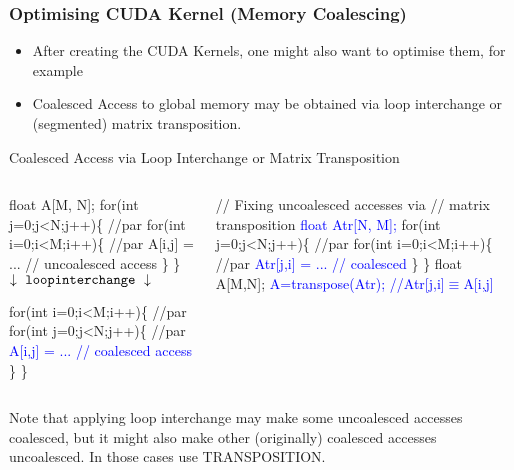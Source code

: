 \documentclass{beamer}
\newcommand{\blue}[1]{\textcolor{Blue}{{#1}}}
\newcommand{\emp}[1]{\textcolor{DikuRed}{ #1}}
\newcommand{\emphh}[1]{\textcolor{CosGreen}{ #1}}
\newcommand{\mymath}[1]{$ #1 $}
\begin{document}
\begin{frame}[fragile]
	\tableofcontents[currentsubsection]
\end{frame}


\begin{frame}[fragile,t]
  \frametitle{Optimising CUDA Kernel (Memory Coalescing)} %


\begin{itemize}
\item After creating the CUDA Kernels, one might also want to
        optimise them, for example
\item Coalesced Access to global memory may be obtained via
        loop interchange or (segmented) matrix transposition. 
\end{itemize}
\vspace{-2ex}
\begin{block}{Coalesced Access via Loop Interchange or Matrix Transposition}
\begin{columns}
\begin{colorcode}
\emp{float A[M, N];}
\emphh{for(int j=0;j<N;j++)\{ //par}
  \emphh{for(int i=0;i<M;i++)\{ //par}
    \emp{A[i,j] = ... // uncoalesced access} 
\} \}  \mymath{\downarrow \ {\tt loop interchange} \ \downarrow}

\emphh{for(int i=0;i<M;i++)\{ //par}
  \emphh{for(int j=0;j<N;j++)\{ //par}
    \blue{A[i,j] = ... // coalesced access} 
\} \}
\end{colorcode}
\begin{colorcode}
// Fixing uncoalesced accesses via 
// matrix transposition
\blue{float Atr[N, M];}
\emphh{for(int j=0;j<N;j++)\{ //par}
  \emphh{for(int i=0;i<M;i++)\{ //par}
    \blue{Atr[j,i] = ... // coalesced} 
\} \}
float A[M,N];
\blue{A=transpose(Atr); //Atr[j,i]\mymath{\equiv}A[i,j]}
\end{colorcode}
\end{columns}
\end{block} 

\emp{Note that applying loop interchange may make some uncoalesced
accesses coalesced, but it might also make other (originally) coalesced
accesses uncoalesced. In those cases use TRANSPOSITION.}


\end{frame}
\end{document}
